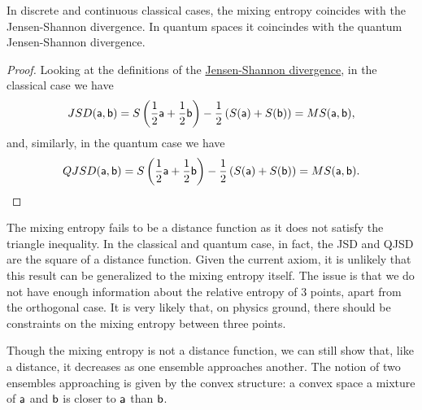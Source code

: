 \begin{mathSection}
\begin{prop}
	In discrete and continuous classical cases, the mixing entropy coincides with the Jensen-Shannon divergence. In quantum spaces it coincindes with the quantum Jensen-Shannon divergence.
\end{prop}

\begin{proof}
	Looking at the definitions of the \href{https://en.wikipedia.org/wiki/Jensen%E2%80%93Shannon_divergence}{Jensen-Shannon divergence}, in the classical case we have
	$$ JSD(\ens[a], \ens[b]) = S\left(\frac{1}{2}\ens[a] + \frac{1}{2}\ens[b] \right)  - \frac{1}{2} \left(S(\ens[a]) + S(\ens[b])\right) = MS(\ens[a], \ens[b]),$$
	and, similarly, in the quantum case we have
	$$ QJSD(\ens[a], \ens[b]) = S\left(\frac{1}{2}\ens[a] + \frac{1}{2}\ens[b] \right)  - \frac{1}{2} \left(S(\ens[a]) + S(\ens[b])\right) = MS(\ens[a], \ens[b]).$$
\end{proof}

\begin{remark}
	The mixing entropy fails to be a distance function as it does not satisfy the triangle inequality. In the classical and quantum case, in fact, the JSD and QJSD are the square of a distance function. Given the current axiom, it is unlikely that this result can be generalized to the mixing entropy itself. The issue is that we do not have enough information about the relative entropy of 3 points, apart from the orthogonal case. It is very likely that, on physics ground, there should be constraints on the mixing entropy between three points.
\end{remark}
\end{mathSection}

Though the mixing entropy is not a distance function, we can still show that, like a distance, it decreases as one ensemble approaches another. The notion of two ensembles approaching is given by the convex structure: a convex space a mixture of $\ens[a]$ and $\ens[b]$ is closer to $\ens[a]$ than $\ens[b]$.

